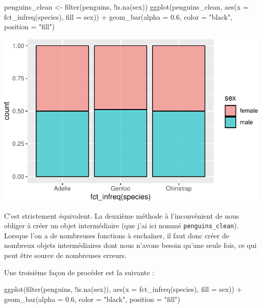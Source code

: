\documentclass[
  a4paper,
  DIV=11,
  numbers=noendperiod,
  oneside]{scrreprt}
\newenvironment{Shaded}{}{}
\newcommand{\AttributeTok}[1]{\textcolor[rgb]{0.84,0.23,0.29}{#1}}
\newcommand{\FloatTok}[1]{\textcolor[rgb]{0.00,0.36,0.77}{#1}}
\newcommand{\FunctionTok}[1]{\textcolor[rgb]{0.44,0.26,0.76}{#1}}
\newcommand{\NormalTok}[1]{\textcolor[rgb]{0.14,0.16,0.18}{#1}}
\newcommand{\OtherTok}[1]{\textcolor[rgb]{0.44,0.26,0.76}{#1}}
\newcommand{\SpecialCharTok}[1]{\textcolor[rgb]{0.00,0.36,0.77}{#1}}
\newcommand{\StringTok}[1]{\textcolor[rgb]{0.01,0.18,0.38}{#1}}
\begin{document}
\begin{Shaded}
\begin{Highlighting}[]
\NormalTok{penguins\_clean }\OtherTok{\textless{}{-}} \FunctionTok{filter}\NormalTok{(penguins, }\SpecialCharTok{!}\FunctionTok{is.na}\NormalTok{(sex))}
\FunctionTok{ggplot}\NormalTok{(penguins\_clean, }\FunctionTok{aes}\NormalTok{(}\AttributeTok{x =} \FunctionTok{fct\_infreq}\NormalTok{(species), }\AttributeTok{fill =}\NormalTok{ sex)) }\SpecialCharTok{+}
    \FunctionTok{geom\_bar}\NormalTok{(}\AttributeTok{alpha =} \FloatTok{0.6}\NormalTok{, }\AttributeTok{color =} \StringTok{"black"}\NormalTok{, }\AttributeTok{position =} \StringTok{"fill"}\NormalTok{)}
\end{Highlighting}
\end{Shaded}

\includegraphics{04-DataWrangling_files/figure-pdf/unnamed-chunk-14-1.pdf}

C'est strictement équivalent. La deuxième méthode à l'inconvénient de
nous obliger à créer un objet intermédiaire (que j'ai ici nommé
\texttt{penguins\_clean}). Lorsque l'on a de nombreuses fonctions à
enchaîner, il faut donc créer de nombreux objets intermédiaires dont
nous n'avons besoin qu'une seule fois, ce qui peut être source de
nombreuses erreurs.

Une troisième façon de procéder est la suivante :

\begin{Shaded}
\begin{Highlighting}[]
\FunctionTok{ggplot}\NormalTok{(}\FunctionTok{filter}\NormalTok{(penguins, }\SpecialCharTok{!}\FunctionTok{is.na}\NormalTok{(sex)), }
       \FunctionTok{aes}\NormalTok{(}\AttributeTok{x =} \FunctionTok{fct\_infreq}\NormalTok{(species), }\AttributeTok{fill =}\NormalTok{ sex)) }\SpecialCharTok{+}
    \FunctionTok{geom\_bar}\NormalTok{(}\AttributeTok{alpha =} \FloatTok{0.6}\NormalTok{, }\AttributeTok{color =} \StringTok{"black"}\NormalTok{, }\AttributeTok{position =} \StringTok{"fill"}\NormalTok{)}
\end{Highlighting}
\end{Shaded}
\end{document}
